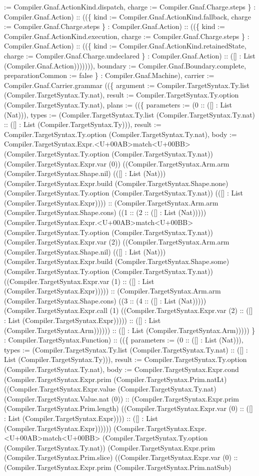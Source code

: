 \documentclass[11pt]{article}
\begin{document}
:= Compiler.Gnaf.ActionKind.dispatch, charge := Compiler.Gnaf.Charge.steps \} : Compiler.Gnaf.Action) :: ((\{ kind := Compiler.Gnaf.ActionKind.fallback, charge := Compiler.Gnaf.Charge.steps \} : Compiler.Gnaf.Action) :: ((\{ kind := Compiler.Gnaf.ActionKind.execution, charge := Compiler.Gnaf.Charge.steps \} : Compiler.Gnaf.Action) :: ((\{ kind := Compiler.Gnaf.ActionKind.retainedState, charge := Compiler.Gnaf.Charge.undeclared \} : Compiler.Gnaf.Action) :: ([] : List (Compiler.Gnaf.Action))))))), boundary := Compiler.Gnaf.Boundary.complete, preparationCommon := false \} : Compiler.Gnaf.Machine), carrier := Compiler.Gnaf.Carrier.grammar ((\{ argument := Compiler.TargetSyntax.Ty.list (Compiler.TargetSyntax.Ty.nat), result := Compiler.TargetSyntax.Ty.option (Compiler.TargetSyntax.Ty.nat), plans := ((\{ parameters := (0 :: ([] : List (Nat))), types := (Compiler.TargetSyntax.Ty.list (Compiler.TargetSyntax.Ty.nat) :: ([] : List (Compiler.TargetSyntax.Ty))), result := Compiler.TargetSyntax.Ty.option (Compiler.TargetSyntax.Ty.nat), body := Compiler.TargetSyntax.Expr.<U+00AB>match<U+00BB> (Compiler.TargetSyntax.Ty.option (Compiler.TargetSyntax.Ty.nat)) (Compiler.TargetSyntax.Expr.var (0)) ((Compiler.TargetSyntax.Arm.arm (Compiler.TargetSyntax.Shape.nil) (([] : List (Nat))) (Compiler.TargetSyntax.Expr.build (Compiler.TargetSyntax.Shape.none) (Compiler.TargetSyntax.Ty.option (Compiler.TargetSyntax.Ty.nat)) (([] : List (Compiler.TargetSyntax.Expr)))) :: (Compiler.TargetSyntax.Arm.arm (Compiler.TargetSyntax.Shape.cons) ((1 :: (2 :: ([] : List (Nat))))) (Compiler.TargetSyntax.Expr.<U+00AB>match<U+00BB> (Compiler.TargetSyntax.Ty.option (Compiler.TargetSyntax.Ty.nat)) (Compiler.TargetSyntax.Expr.var (2)) ((Compiler.TargetSyntax.Arm.arm (Compiler.TargetSyntax.Shape.nil) (([] : List (Nat))) (Compiler.TargetSyntax.Expr.build (Compiler.TargetSyntax.Shape.some) (Compiler.TargetSyntax.Ty.option (Compiler.TargetSyntax.Ty.nat)) ((Compiler.TargetSyntax.Expr.var (1) :: ([] : List (Compiler.TargetSyntax.Expr))))) :: (Compiler.TargetSyntax.Arm.arm (Compiler.TargetSyntax.Shape.cons) ((3 :: (4 :: ([] : List (Nat))))) (Compiler.TargetSyntax.Expr.call (1) ((Compiler.TargetSyntax.Expr.var (2) :: ([] : List (Compiler.TargetSyntax.Expr))))) :: ([] : List (Compiler.TargetSyntax.Arm)))))) :: ([] : List (Compiler.TargetSyntax.Arm))))) \} : Compiler.TargetSyntax.Function) :: ((\{ parameters := (0 :: ([] : List (Nat))), types := (Compiler.TargetSyntax.Ty.list (Compiler.TargetSyntax.Ty.nat) :: ([] : List (Compiler.TargetSyntax.Ty))), result := Compiler.TargetSyntax.Ty.option (Compiler.TargetSyntax.Ty.nat), body := Compiler.TargetSyntax.Expr.cond (Compiler.TargetSyntax.Expr.prim (Compiler.TargetSyntax.Prim.natLt) ((Compiler.TargetSyntax.Expr.value (Compiler.TargetSyntax.Ty.nat) (Compiler.TargetSyntax.Value.nat (0)) :: (Compiler.TargetSyntax.Expr.prim (Compiler.TargetSyntax.Prim.length) ((Compiler.TargetSyntax.Expr.var (0) :: ([] : List (Compiler.TargetSyntax.Expr)))) :: ([] : List (Compiler.TargetSyntax.Expr)))))) (Compiler.TargetSyntax.Expr.<U+00AB>match<U+00BB> (Compiler.TargetSyntax.Ty.option (Compiler.TargetSyntax.Ty.nat)) (Compiler.TargetSyntax.Expr.prim (Compiler.TargetSyntax.Prim.slice) ((Compiler.TargetSyntax.Expr.var (0) :: (Compiler.TargetSyntax.Expr.prim (Compiler.TargetSyntax.Prim.natSub) 
\end{document}
